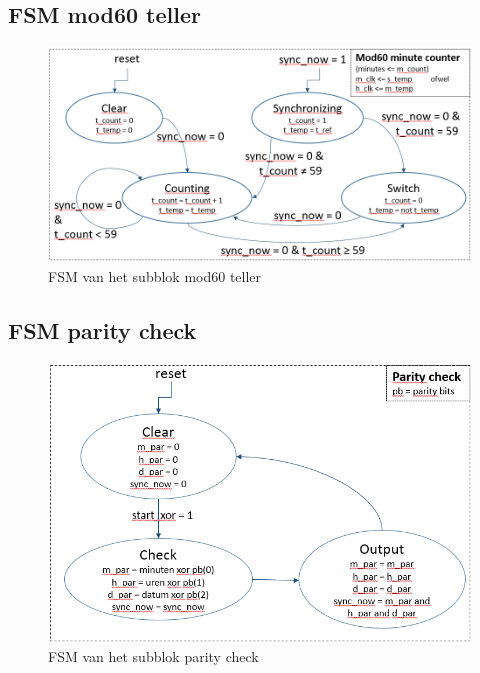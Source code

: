 \documentclass[a4paper, twoside, 10pt]{article}
\begin{document}
\subsection{FSM mod60 teller}
\begin{figure}[ht]
\begin{center}
\includegraphics[keepaspectratio=true,scale=0.7]{FSM_Mod60_min__and_sec__counter.png}
\caption{FSM van het subblok mod60 teller}
\label{fig: mod60_teller}
\end{center}
\end{figure}

\subsection{FSM parity check}
\begin{figure}[ht]
\begin{center}
\includegraphics[keepaspectratio=true,scale=0.9]{FSM_Parity_check.png}
\caption{FSM van het subblok parity check}
\label{fig: parity_check}
\end{center}
\end{figure}
\end{document}
